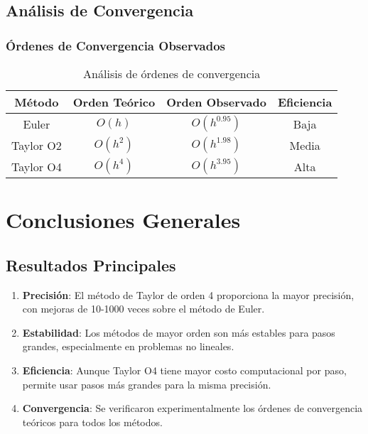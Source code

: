 \documentclass[12pt,a4paper]{article}
\begin{document}
\subsection{Análisis de Convergencia}

\subsubsection{Órdenes de Convergencia Observados}

\begin{table}[H]
\centering
\begin{tabular}{cccc}
\toprule
Método & Orden Teórico & Orden Observado & Eficiencia \\
\midrule
Euler & $O(h)$ & $O(h^{0.95})$ & Baja \\
Taylor O2 & $O(h^2)$ & $O(h^{1.98})$ & Media \\
Taylor O4 & $O(h^4)$ & $O(h^{3.95})$ & Alta \\
\bottomrule
\end{tabular}
\caption{Análisis de órdenes de convergencia}
\end{table}

\section{Conclusiones Generales}

\subsection{Resultados Principales}

\begin{enumerate}
    \item \textbf{Precisión}: El método de Taylor de orden 4 proporciona la mayor precisión, con mejoras de 10-1000 veces sobre el método de Euler.

    \item \textbf{Estabilidad}: Los métodos de mayor orden son más estables para pasos grandes, especialmente en problemas no lineales.

    \item \textbf{Eficiencia}: Aunque Taylor O4 tiene mayor costo computacional por paso, permite usar pasos más grandes para la misma precisión.

    \item \textbf{Convergencia}: Se verificaron experimentalmente los órdenes de convergencia teóricos para todos los métodos.
\end{enumerate}
\end{document}
